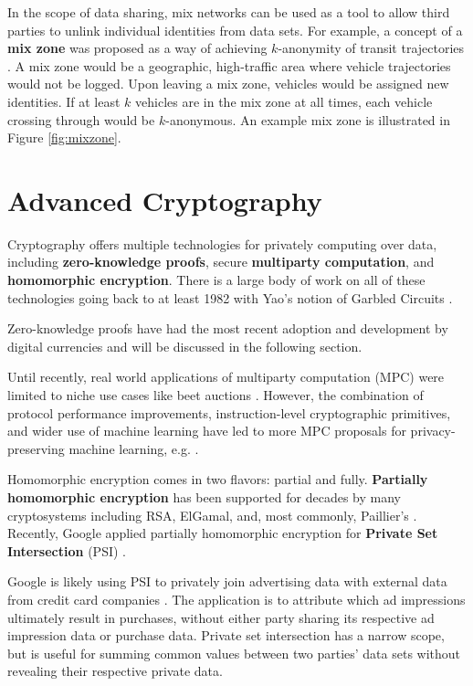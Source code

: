 \documentclass[nobib]{tufte-handout}
\begin{document}
In the scope of data sharing, mix networks can be used as a tool to allow third
parties to unlink individual identities from data sets. For example, a
concept of a \textbf{mix zone} was proposed as a way of achieving $k$-anonymity of
transit trajectories \cite{freudiger2007mix}. A mix zone would be a geographic,
high-traffic area where vehicle trajectories would not be logged. Upon leaving
a mix zone, vehicles would be assigned new identities. If at least $k$ vehicles
are in the mix zone at all times, each vehicle crossing through would be
$k$-anonymous. An example mix zone is illustrated in Figure \ref{fig:mixzone}.

\section{Advanced Cryptography}

Cryptography offers multiple technologies for privately computing over data,
including \textbf{zero-knowledge proofs}, secure \textbf{multiparty
computation}, and \textbf{homomorphic encryption}. There is a large body of work
on all of these technologies going back to at least 1982 with Yao's notion of
Garbled Circuits \cite{DBLP:conf/focs/Yao82b}.

Zero-knowledge proofs have had the most recent adoption and development by
digital currencies and will be discussed in the following section.

Until recently, real world applications of multiparty computation (MPC) were
limited to niche use cases like beet auctions \cite{DBLP:conf/fc/BogetoftCDGJKNNNPST09}.
However, the combination of protocol performance improvements, instruction-level
cryptographic primitives, and wider use of machine learning have led to
more MPC proposals for privacy-preserving machine learning, e.g.
\cite{DBLP:conf/ccs/BonawitzIKMMPRS17}.

Homomorphic encryption comes in two flavors: partial and fully.
\textbf{Partially homomorphic encryption} has been supported for decades by many
cryptosystems including RSA, ElGamal, and, most commonly, Paillier's
\cite{DBLP:conf/eurocrypt/Paillier99}. Recently, Google applied partially
homomorphic encryption for \textbf{Private Set Intersection} (PSI)
\cite{google-psi}.

Google is likely using PSI to privately join advertising data with external data
from credit card companies \cite{google-mastercard}. The application is to
attribute which ad impressions ultimately result in purchases, without either
party sharing its respective ad impression data or purchase data. Private set
intersection has a narrow scope, but is useful for summing common values between
two parties’ data sets without revealing their respective private data.
\end{document}
